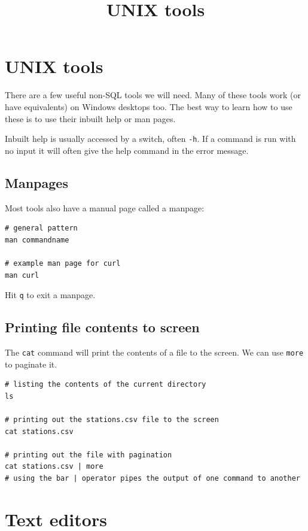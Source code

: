 \documentclass{pgnotes}
\title{UNIX tools}
\begin{document}
\maketitle

\section{UNIX tools}\label{unix-tools}

There are a few useful non-SQL tools we will need. Many of these tools work (or have equivalents) on Windows desktops too.
The best way to learn how to use these is to use their inbuilt help or man pages.

Inbuilt help is usually accessed by a switch, often \texttt{-h}.
If a command is run with no input it will often give the help command in the error message.

\subsection{Manpages}

Most tools also have a manual page called a manpage:

\begin{verbatim}
# general pattern
man commandname

# example man page for curl 
man curl
\end{verbatim}

Hit \texttt{q} to exit a manpage.

\subsection{Printing file contents to screen}
\label{printing-file-contents-to-screen}

The \texttt{cat} command will print the contents of a file to the screen.
We can use \texttt{more} to paginate it.

\begin{verbatim}
# listing the contents of the current directory
ls

# printing out the stations.csv file to the screen
cat stations.csv

# printing out the file with pagination
cat stations.csv | more
# using the bar | operator pipes the output of one command to another
\end{verbatim}

\section{Text editors}
\end{document}
